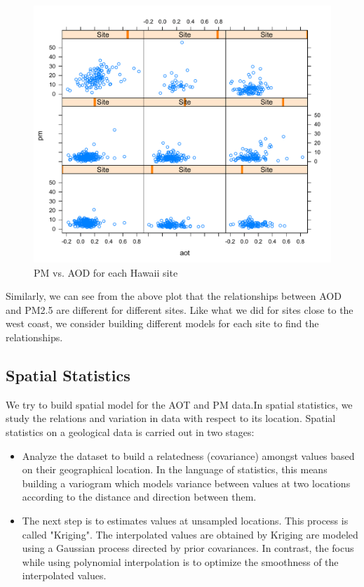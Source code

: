 \documentclass[10pt]{article}
\begin{document}
\begin{figure}[!h]
\centering
\includegraphics[width=\linewidth]{1.pdf}
\caption{PM vs. AOD for each Hawaii site}
\label{fig3.4}
\end{figure}

Similarly, we can see from the above plot that the relationships between AOD and PM2.5 are different for different sites. Like what we did for sites close to the west coast, we consider building different models for each site to find the relationships.

\subsection{Spatial Statistics}
We try to build spatial model for the AOT and PM data.In spatial statistics, we study the relations and variation in data with respect to its location. Spatial statistics on a geological data is carried out in two stages:

\begin{itemize}
\item Analyze the dataset to build a relatedness (covariance) amongst values based on their geographical location. In the language of statistics, this means building a variogram which models variance between values at two locations according to the distance and direction between them.
\item The next step is to estimates values at unsampled locations. This process is called "Kriging". The interpolated values are obtained by Kriging are modeled using a Gaussian process directed by prior covariances. In contrast, the focus while using polynomial interpolation is to optimize the smoothness of the interpolated values.
\end{itemize}
\end{document}
